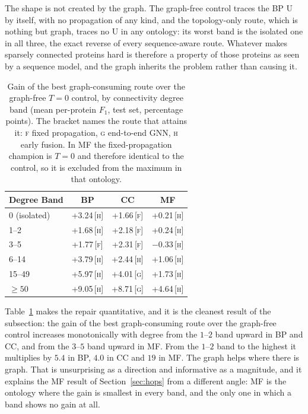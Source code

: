 \documentclass[Ingles]{ic-tese-v3}
\begin{document}
The shape is not created by the graph. The graph-free control traces the BP U by itself,
with no propagation of any kind, and the topology-only route, which is nothing but graph,
traces no U in any ontology: its worst band is the isolated one in all three, the exact
reverse of every sequence-aware route. Whatever
makes sparsely connected proteins hard is therefore a property of those proteins as seen by
a sequence model, and the graph inherits the problem rather than causing it.

\begin{table}[!htb]
  \centering
  \caption{Gain of the best graph-consuming route over the graph-free $T=0$ control, by connectivity degree band (mean per-protein $F_1$, test set, percentage points). The bracket names the route that attains it: \textsc{f} fixed propagation, \textsc{g} end-to-end GNN, \textsc{h} early fusion. In MF the fixed-propagation champion is $T=0$ and therefore identical to the control, so it is excluded from the maximum in that ontology.}
  \label{tab:degree_graph_gain}
  \small
  \begin{tabular}{lccc}
    \toprule
    Degree Band & BP & CC & MF \\
    \midrule
    0 (isolated) & +3.24\,\tiny{[\textsc{h}]} & +1.66\,\tiny{[\textsc{f}]} & +0.21\,\tiny{[\textsc{h}]} \\
    1--2 & +1.68\,\tiny{[\textsc{h}]} & +2.18\,\tiny{[\textsc{f}]} & +0.24\,\tiny{[\textsc{h}]} \\
    3--5 & +1.77\,\tiny{[\textsc{f}]} & +2.31\,\tiny{[\textsc{f}]} & $-$0.33\,\tiny{[\textsc{h}]} \\
    6--14 & +3.79\,\tiny{[\textsc{h}]} & +2.44\,\tiny{[\textsc{h}]} & +1.06\,\tiny{[\textsc{h}]} \\
    15--49 & +5.97\,\tiny{[\textsc{h}]} & +4.01\,\tiny{[\textsc{g}]} & +1.73\,\tiny{[\textsc{h}]} \\
    $\geq 50$ & +9.05\,\tiny{[\textsc{h}]} & +8.71\,\tiny{[\textsc{g}]} & +4.64\,\tiny{[\textsc{h}]} \\
    \bottomrule
  \end{tabular}
\end{table}

Table~\ref{tab:degree_graph_gain} makes the repair quantitative, and it is the cleanest
result of the subsection: the gain of the best graph-consuming route over the graph-free
control increases monotonically with degree from the $1$--$2$ band upward in BP and CC, and
from the $3$--$5$ band upward in MF. From the $1$--$2$ band to the highest it multiplies by
$5.4$ in BP, $4.0$ in CC and $19$ in MF. The graph helps where there is graph. That is
unsurprising as a direction and informative as a magnitude, and it explains the MF result of
Section~\ref{sec:hops} from a different angle: MF is the ontology where the gain is smallest
in every band, and the only one in which a band shows no gain at all.
\end{document}
